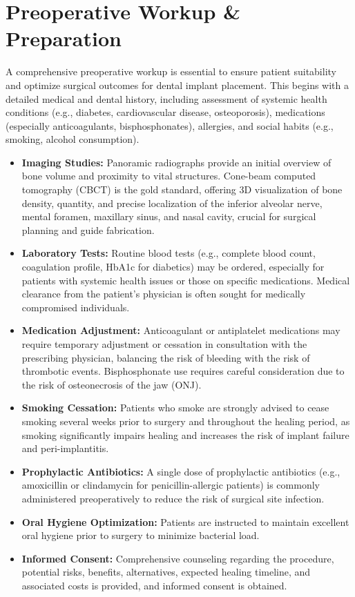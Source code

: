 \section*{Preoperative Workup \& Preparation}
A comprehensive preoperative workup is essential to ensure patient suitability and optimize surgical outcomes for dental implant placement. This begins with a detailed medical and dental history, including assessment of systemic health conditions (e.g., diabetes, cardiovascular disease, osteoporosis), medications (especially anticoagulants, bisphosphonates), allergies, and social habits (e.g., smoking, alcohol consumption).

\begin{itemize}
  \item \textbf{Imaging Studies:} Panoramic radiographs provide an initial overview of bone volume and proximity to vital structures. Cone-beam computed tomography (CBCT) is the gold standard, offering 3D visualization of bone density, quantity, and precise localization of the inferior alveolar nerve, mental foramen, maxillary sinus, and nasal cavity, crucial for surgical planning and guide fabrication.
  
  \item \textbf{Laboratory Tests:} Routine blood tests (e.g., complete blood count, coagulation profile, HbA1c for diabetics) may be ordered, especially for patients with systemic health issues or those on specific medications. Medical clearance from the patient's physician is often sought for medically compromised individuals.
  
  \item \textbf{Medication Adjustment:} Anticoagulant or antiplatelet medications may require temporary adjustment or cessation in consultation with the prescribing physician, balancing the risk of bleeding with the risk of thrombotic events. Bisphosphonate use requires careful consideration due to the risk of osteonecrosis of the jaw (ONJ).
  
  \item \textbf{Smoking Cessation:} Patients who smoke are strongly advised to cease smoking several weeks prior to surgery and throughout the healing period, as smoking significantly impairs healing and increases the risk of implant failure and peri-implantitis.
  
  \item \textbf{Prophylactic Antibiotics:} A single dose of prophylactic antibiotics (e.g., amoxicillin or clindamycin for penicillin-allergic patients) is commonly administered preoperatively to reduce the risk of surgical site infection.
  
  \item \textbf{Oral Hygiene Optimization:} Patients are instructed to maintain excellent oral hygiene prior to surgery to minimize bacterial load.
  
  \item \textbf{Informed Consent:} Comprehensive counseling regarding the procedure, potential risks, benefits, alternatives, expected healing timeline, and associated costs is provided, and informed consent is obtained.
\end{itemize}

